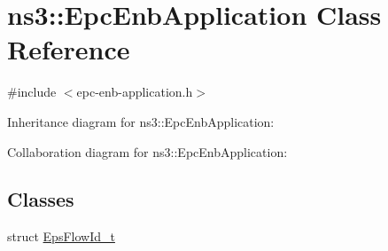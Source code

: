 \hypertarget{classns3_1_1EpcEnbApplication}{}\section{ns3\+:\+:Epc\+Enb\+Application Class Reference}
\label{classns3_1_1EpcEnbApplication}


{\ttfamily \#include $<$epc-\/enb-\/application.\+h$>$}



Inheritance diagram for ns3\+:\+:Epc\+Enb\+Application\+:


Collaboration diagram for ns3\+:\+:Epc\+Enb\+Application\+:
\subsection*{Classes}
\begin{DoxyCompactItemize}
\item 
struct \hyperlink{structns3_1_1EpcEnbApplication_1_1EpsFlowId__t}{Eps\+Flow\+Id\+\_\+t}
\end{DoxyCompactItemize}
